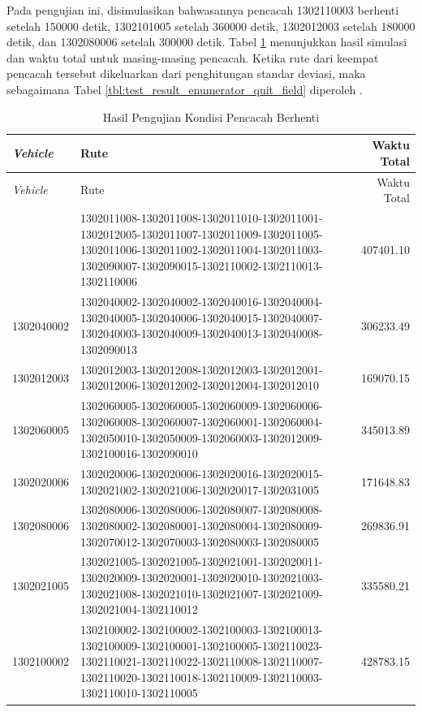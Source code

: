 Pada pengujian ini, disimulasikan bahwasannya pencacah 1302110003 berhenti setelah 150000 detik, 1302101005 setelah 360000 detik, 1302012003 setelah 180000 detik, dan 1302080006 setelah 300000 detik. Tabel \ref{tbl:test_result_enumerator_quit_field_pubsub_coes} menunjukkan hasil simulasi dan waktu total untuk masing-masing pencacah. Ketika rute dari keempat pencacah tersebut dikeluarkan dari penghitungan standar deviasi, maka sebagaimana Tabel \ref{tbl:test_result_enumerator_quit_field} diperoleh .


\begin{longtable}[!]{lp{8cm}r}
	\caption{Hasil Pengujian Kondisi Pencacah Berhenti}
	\label{tbl:test_result_enumerator_quit_field_pubsub_coes}\\
	\toprule
		\textit{Vehicle} & Rute & Waktu Total\\ 
	\midrule
	\endfirsthead
	\toprule
		\textit{Vehicle} & Rute & Waktu Total\\ 
	\midrule
	\endhead
	\bottomrule
	\endfoot
		1302011008 & 1302011008-1302011008-1302011010-1302011001-1302012005-1302011007-1302011009-1302011005-1302011006-1302011002-1302011004-1302011003-1302090007-1302090015-1302110002-1302110013-1302110006 & 407401.10 \\
		1302040002 & 1302040002-1302040002-1302040016-1302040004-1302040005-1302040006-1302040015-1302040007-1302040003-1302040009-1302040013-1302040008-1302090013 & 306233.49 \\
		1302012003 & 1302012003-1302012008-1302012003-1302012001-1302012006-1302012002-1302012004-1302012010 & 169070.15 \\
		1302060005 & 1302060005-1302060005-1302060009-1302060006-1302060008-1302060007-1302060001-1302060004-1302050010-1302050009-1302060003-1302012009-1302100016-1302090010 & 345013.89 \\
		1302020006 & 1302020006-1302020006-1302020016-1302020015-1302021002-1302021006-1302020017-1302031005 & 171648.83 \\
		1302080006 & 1302080006-1302080006-1302080007-1302080008-1302080002-1302080001-1302080004-1302080009-1302070012-1302070003-1302080003-1302080005 & 269836.91 \\
		1302021005 & 1302021005-1302021005-1302021001-1302020011-1302020009-1302020001-1302020010-1302021003-1302021008-1302021010-1302021007-1302021009-1302021004-1302110012 & 335580.21 \\
		1302100002 & 1302100002-1302100002-1302100003-1302100013-1302100009-1302100001-1302100005-1302110023-1302110021-1302110022-1302110008-1302110007-1302110020-1302110018-1302110009-1302110003-1302110010-1302110005 & 428783.15 \\

\end{longtable}
